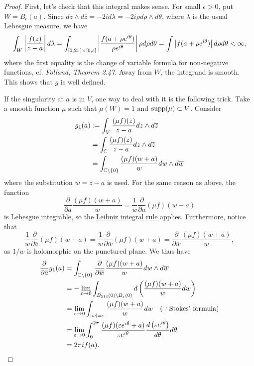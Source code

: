 \documentclass{article}
\begin{document}
\begin{proof}
    First, let's check that this integral makes sense. For small $\epsilon>0$, put $W=B_\epsilon(a)$. Since $dz\wedge d\overline{z}=-2i d\lambda=-2i\rho d\rho\wedge d\theta$, where $\lambda$ is the usual Lebesgue measure, we have
    \begin{align*}
        \int_{W} \left\vert\frac{f(z)}{z-a}\right\vert d\lambda 
        = \int_{[0,2\pi]\times[0,\varepsilon]} \left\vert\frac{f(a+\rho e^{i\theta})}{\rho e^{i\theta}}\right\vert \rho d\rho d\theta 
        = \int \left\vert f(a+\rho e^{i\theta})\right\vert d\rho d\theta
        < \infty,
    \end{align*}
    where the first equality is the change of variable formula for non-negative functions, cf. \emph{Folland, Theorem 2.47}. Away from $W$, the integrand is smooth. This shows that $g$ is well defined. 
    
    If the singularity at $a$ is in $V$, one way to deal with it is the following trick. Take a smooth function $\mu$ such that $\mu(W)=1$ and $\operatorname{supp}(\mu)\subset V$. Consider
    \begin{align*}
        g_1(a) 
        &:= \int_{V}\frac{(\mu f)(z)}{z-a}dz\wedge d\overline{z} \\
        &= \int_{\mathbb{C}}\frac{(\mu f)(z)}{z-a}dz\wedge d\overline{z} \\
        &= \int_{\mathbb{C}\setminus\left\{0\right\}}\frac{(\mu f)(w+a)}{w}dw\wedge d\overline{w}
    \end{align*}
    where the substitution $w=z-a$ is used. For the same reason as above, the function
    \[
        \frac{\partial}{\partial\overline{a}}\frac{(\mu f)(w+a)}{w}
        = \frac{1}{w}\frac{\partial}{\partial\overline{a}}(\mu f)(w+a)
    \]
    is Lebesgue integrable, so the \href{https://en.wikipedia.org/wiki/Leibniz_integral_rule#Measure_theory_statement}{Leibniz integral rule} applies. Furthermore, notice that
    \[
        \frac{1}{w}\frac{\partial}{\partial\overline{a}}(\mu f)(w+a)
        = \frac{1}{w}\frac{\partial}{\partial\overline{w}}(\mu f)(w+a)
        = \frac{\partial}{\partial\overline{w}}\frac{(\mu f)(w+a)}{w},
    \]
    as $1/w$ is holomorphic on the punctured plane. We thus have
    \begin{align*}
        \frac{\partial}{\partial\overline{a}}g_1(a)
        &= \int_{\mathbb{C}\setminus\left\{0\right\}} \frac{\partial}{\partial\overline{w}}\frac{(\mu f)(w+a)}{w} dw\wedge d\overline{w} \\
        &= -\lim_{\varepsilon\to 0} \int_{B_{514}(0)\setminus B_{\varepsilon}(0)} d\left(\frac{(\mu f)(w+a)}{w} dw\right) \\
        &= \lim_{\varepsilon\to 0} \int_{\left\vert w\right\vert=\varepsilon} \frac{(\mu f)(w+a)}{w} dw \quad(\because\text{Stokes' formula})\\
        &= \lim_{\varepsilon\to 0} \int_{0}^{2\pi} \frac{(\mu f)(\varepsilon e^{i\theta}+a)}{\varepsilon e^{i\theta}} \frac{d\left(\varepsilon e^{i\theta}\right)}{d\theta}d\theta \\
        &= 2\pi i f(a).
    \end{align*}


\end{proof}
\end{document}
